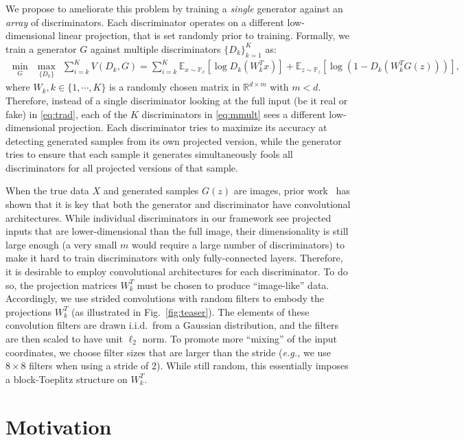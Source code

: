 \documentclass{article}
\newcommand{\pz}{\mathbb{P}_{z}}
\newcommand{\px}{\mathbb{P}_{x}}
\newcommand{\expec}{\mathbb{E}}
\begin{document}
We propose to ameliorate this problem by training a \emph{single} generator against an \emph{array} of discriminators. Each discriminator operates on a different low-dimensional linear projection, that is set randomly prior to training. Formally, we train a generator $G$ against multiple discriminators $\{D_k\}_{k=1}^K$ as:
\begin{align}\label{eq:mmult}
\underset{G}{\min} ~~  \underset{ \{ D_k \} }{\max} ~~  \sum_{i=k}^K V(D_k, G) =  \sum_{i=k}^K \expec_{x \sim \px} [\log D_k(W_k^T x)] + \expec_{z \sim \pz} [\log(1- D_k(W_k^T G(z)))],
\end{align}
where $W_k, k \in \{1, \cdots, K\}$ is a randomly chosen matrix in $\mathbb{R}^{d \times m}$ with $m < d$. Therefore, instead of a single discriminator looking at the full input (be it real or fake) in \eqref{eq:trad}, each of the $K$ discriminators in \eqref{eq:mmult} sees a different low-dimensional projection. Each discriminator tries to maximize its accuracy at detecting generated samples from its own projected version, while the generator tries to ensure that each sample it generates simultaneously fools all discriminators for all projected versions of that sample.

When the true data $X$ and generated samples $G(z)$ are images, prior work~\citep{radford2015unsupervised} has shown that it is key that both the generator and discriminator have convolutional architectures. While individual discriminators in our framework see projected inputs that are lower-dimensional than the full image, their dimensionality is still large enough (a very small $m$ would require a large number of discriminators) to make it hard to train discriminators with only fully-connected layers. Therefore, it is desirable to employ convolutional architectures for each discriminator. To do so, the projection matrices $W_k^T$ must be chosen to produce ``image-like'' data. Accordingly, we use strided convolutions with random filters to embody the projections $W_k^T$ (as illustrated in Fig.~\ref{fig:teaser}). The elements of these convolution filters are drawn i.i.d.~from a Gaussian distribution, and the filters are then scaled to have unit $\ell_2$ norm.  To promote more ``mixing'' of the input coordinates, we choose filter sizes that are larger than the stride   (\emph{e.g.,} we use $8\times 8$ filters when using a stride of 2). While still random, this essentially imposes a block-Toeplitz structure on $W_k^T$.

\section{Motivation}
\label{sec:theory}
\end{document}
